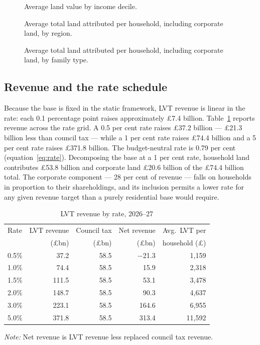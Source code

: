 \begin{figure}[htbp]
\centering
{}
\caption{Average land value by income decile.}
\label{fig:land_income}
\end{figure}

\begin{figure}[htbp]
\centering
{}
\caption{Average total land attributed per household, including corporate land, by region.}
\label{fig:land_region}
\end{figure}

\begin{figure}[htbp]
\centering
{}
\caption{Average total land attributed per household, including corporate land, by family type.}
\label{fig:land_famtype}
\end{figure}

\subsection{Revenue and the rate schedule}
\label{sec:revenue}

Because the base is fixed in the static framework, LVT revenue is linear in the rate: each 0.1 percentage point raises approximately \pounds 7.4 billion. Table~\ref{tab:revenue} reports revenue across the rate grid. A 0.5 per cent rate raises \pounds 37.2 billion --- \pounds 21.3 billion less than council tax --- while a 1 per cent rate raises \pounds 74.4 billion and a 5 per cent rate raises \pounds 371.8 billion. The budget-neutral rate is 0.79 per cent (equation~\ref{eq:rate}). Decomposing the base at a 1 per cent rate, household land contributes \pounds 53.8 billion and corporate land \pounds 20.6 billion of the \pounds 74.4 billion total. The corporate component --- 28 per cent of revenue --- falls on households in proportion to their shareholdings, and its inclusion permits a lower rate for any given revenue target than a purely residential base would require.

\begin{table}[htbp]
\centering
\caption{LVT revenue by rate, 2026--27}
\label{tab:revenue}
\begin{tabular}{lrrrr}
\toprule
Rate & LVT revenue & Council tax & Net revenue & Avg.\ LVT per \\
     & (\pounds bn) & (\pounds bn) & (\pounds bn) & household (\pounds) \\
\midrule
0.5\% & 37.2  & 58.5 & $-$21.3 & 1{,}159 \\
1.0\% & 74.4  & 58.5 & 15.9    & 2{,}318 \\
1.5\% & 111.5 & 58.5 & 53.1    & 3{,}478 \\
2.0\% & 148.7 & 58.5 & 90.3    & 4{,}637 \\
3.0\% & 223.1 & 58.5 & 164.6   & 6{,}955 \\
5.0\% & 371.8 & 58.5 & 313.4   & 11{,}592 \\
\bottomrule
\end{tabular}

\medskip
{\footnotesize\emph{Note:} Net revenue is LVT revenue less replaced council tax revenue.}
\end{table}

